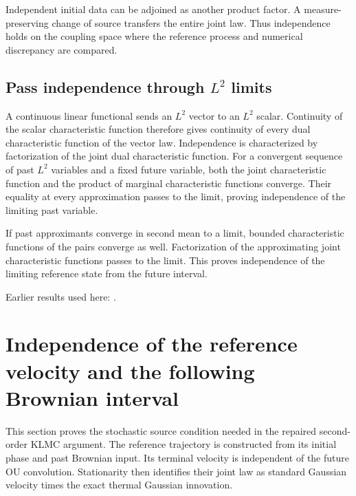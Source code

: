 \documentclass[11pt,a4paper]{report}
\begin{document}
Independent initial data can be adjoined as another product factor. A measure-preserving change of source transfers the entire joint law. Thus independence holds on the coupling space where the reference process and numerical discrepancy are compared.

\subsection{\texorpdfstring{Pass independence through \(L^{2}\) limits}{Pass independence through L² limits}}
\label{report-step-KineticLangevin-PastFutureIndependence-lean-5}


A continuous linear functional sends an \(L^{2}\) vector to an \(L^{2}\) scalar. Continuity of the scalar characteristic function therefore gives continuity of every dual characteristic function of the vector law. Independence is characterized by factorization of the joint dual characteristic function. For a convergent sequence of past \(L^{2}\) variables and a fixed future variable, both the joint characteristic function and the product of marginal characteristic functions converge. Their equality at every approximation passes to the limit, proving independence of the limiting past variable.



If past approximants converge in second mean to a limit, bounded characteristic functions of the pairs converge as well. Factorization of the approximating joint characteristic functions passes to the limit. This proves independence of the limiting reference state from the future interval.



Earlier results used here: \cite[Section~3.5.7]{LangevinLean2026ULASC}.
\section{\texorpdfstring{Independence of the reference velocity and the following Brownian interval}{Independence of the reference velocity and the following Brownian interval}}
\label{proof-module-KineticLangevin-CanonicalPastFuture-lean}


This section proves the stochastic source condition needed in the repaired second-order KLMC argument. The reference trajectory is constructed from its initial phase and past Brownian input. Its terminal velocity is independent of the future OU convolution. Stationarity then identifies their joint law as standard Gaussian velocity times the exact thermal Gaussian innovation.
\end{document}
